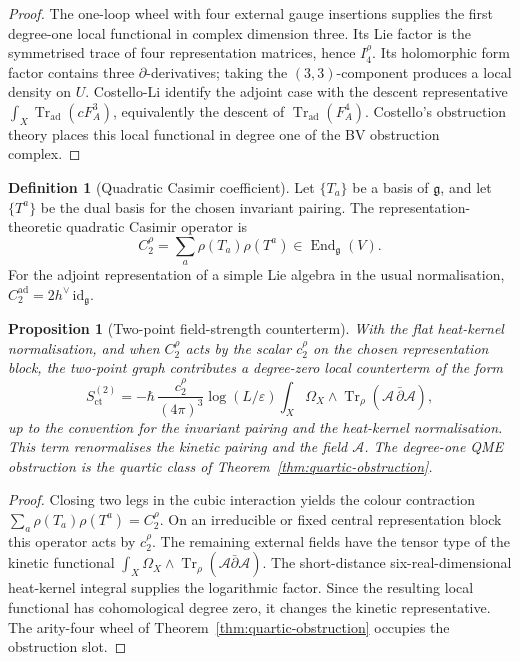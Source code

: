 \documentclass[11pt]{article}
\providecommand{\dbar}{\bar{\partial}}
\providecommand{\fg}{\mathfrak{g}}
\providecommand{\ad}{\operatorname{ad}}
\providecommand{\Tr}{\operatorname{Tr}}
\providecommand{\End}{\operatorname{End}}
\providecommand{\cA}{\mathcal{A}}
\theoremstyle{plain}
\newtheorem{proposition}[theorem]{Proposition}
\theoremstyle{definition}
\newtheorem{definition}[theorem]{Definition}
\theoremstyle{remark}
\begin{document}
\begin{proof}
The one-loop wheel with four external gauge insertions supplies the
first degree-one local functional in complex dimension three. Its Lie
factor is the symmetrised trace of four representation matrices,
hence \(I_4^\rho\). Its holomorphic form factor contains three
\(\partial\)-derivatives; taking the \((3,3)\)-component produces a
local density on \(U\). Costello-Li identify the adjoint case with the
descent representative \(\int_X\Tr_{\ad}(cF_A^3)\), equivalently the
descent of \(\Tr_{\ad}(F_A^4)\). Costello's obstruction theory places
this local functional in degree one of the BV obstruction complex.
\end{proof}

\begin{definition}[Quadratic Casimir coefficient]
\label{def:casimir}
Let \(\{T_a\}\) be a basis of \(\fg\), and let \(\{T^a\}\) be the dual
basis for the chosen invariant pairing. The representation-theoretic
quadratic Casimir operator is
\[
  C_2^\rho=\sum_a\rho(T_a)\rho(T^a)\in\End_{\fg}(V).
\]
For the adjoint representation of a simple Lie algebra in the usual
normalisation, \(C_2^{\ad}=2h^\vee\,\mathrm{id}_{\fg}\).
\end{definition}

\begin{proposition}[Two-point field-strength counterterm]
\label{prop:field-strength}
With the flat heat-kernel normalisation, and when \(C_2^\rho\) acts by
the scalar \(c_2^\rho\) on the chosen representation block, the
two-point graph contributes a degree-zero local counterterm of the form
\[
  S_{\mathrm{ct}}^{(2)}
  =
  -\hbar\,\frac{c_2^\rho}{(4\pi)^3}
  \log(L/\varepsilon)
  \int_X\Omega_X\wedge\Tr_\rho(\cA\,\dbar\cA),
\]
up to the convention for the invariant pairing and the heat-kernel
normalisation. This term renormalises the kinetic pairing and the
field \(\cA\). The degree-one QME obstruction is the quartic class of
Theorem~\ref{thm:quartic-obstruction}.
\end{proposition}

\begin{proof}
Closing two legs in the cubic interaction yields the colour contraction
\(\sum_a\rho(T_a)\rho(T^a)=C_2^\rho\). On an irreducible or fixed
central representation block this operator acts by \(c_2^\rho\). The
remaining external fields have the tensor type of the kinetic functional
\(\int_X\Omega_X\wedge\Tr_\rho(\cA\dbar\cA)\). The short-distance
six-real-dimensional heat-kernel integral supplies the logarithmic
factor. Since the resulting local functional has cohomological degree
zero, it changes the kinetic representative. The arity-four wheel of
Theorem~\ref{thm:quartic-obstruction} occupies the obstruction slot.
\end{proof}
\end{document}
